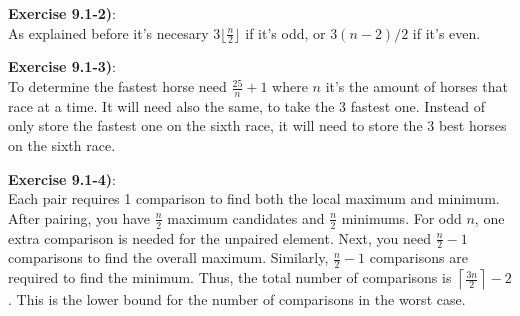 \documentclass{article}
\newcounter{exercise}[section]   %
\begin{document}
\textbf{Exercise 9.1-2)}:\\
As explained before it's necesary \(3\lfloor\frac{n}{2}\rfloor\) if it's odd, or \(3(n-2)/2\)
if it's even.

\textbf{Exercise 9.1-3)}:\\
To determine the fastest horse need \(\frac{25}{n} + 1\) where \(n\) it's the amount of horses
that race at a time. It will need also the same, to take the 3 fastest one. Instead of only
store the fastest one on the sixth race, it will need to store the 3 best horses on the sixth
race.

\textbf{Exercise 9.1-4)}:\\
Each pair requires 1 comparison to find both the local maximum and minimum.  
After pairing, you have \( \frac{n}{2} \) maximum candidates and \( \frac{n}{2} \) minimums.  
For odd \(n\), one extra comparison is needed for the unpaired element.  
Next, you need \( \frac{n}{2} - 1 \) comparisons to find the overall maximum.  
Similarly, \( \frac{n}{2} - 1 \) comparisons are required to find the minimum.  
Thus, the total number of comparisons is \( \left\lceil \frac{3n}{2} \right\rceil - 2 \).  
This is the lower bound for the number of comparisons in the worst case.
\end{document}
